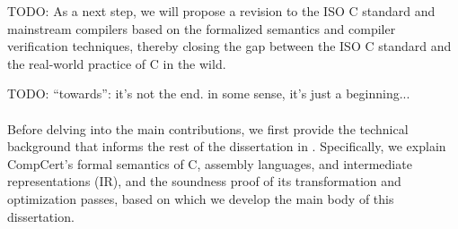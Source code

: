 TODO: As a next step, we will propose a revision to the ISO C standard and mainstream compilers
based on the formalized semantics and compiler verification techniques, thereby closing the gap
between the ISO C standard and the real-world practice of C in the wild.

TODO: ``towards'': it's not the end.  in some sense, it's just a beginning...



\paragraph*{}

Before delving into the main contributions, we first provide the technical background that informs
the rest of the dissertation in .  Specifically, we explain CompCert's formal
semantics of C, assembly languages, and intermediate representations (IR), and the soundness proof
of its transformation and optimization passes, based on which we develop the main body of this
dissertation.


%


